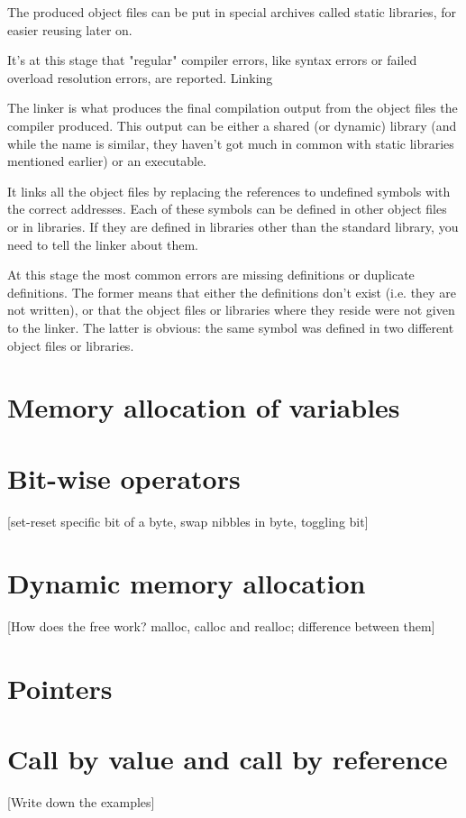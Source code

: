 \documentclass[11pt]{article}
\begin{document}
The produced object files can be put in special archives called static
libraries, for easier reusing later on.

It's at this stage that "regular" compiler errors, like syntax errors
or failed overload resolution errors, are reported.  Linking

The linker is what produces the final compilation output from the
object files the compiler produced. This output can be either a shared
(or dynamic) library (and while the name is similar, they haven't got
much in common with static libraries mentioned earlier) or an
executable.

It links all the object files by replacing the references to undefined
symbols with the correct addresses. Each of these symbols can be
defined in other object files or in libraries. If they are defined in
libraries other than the standard library, you need to tell the linker
about them.

At this stage the most common errors are missing definitions or
duplicate definitions. The former means that either the definitions
don't exist (i.e. they are not written), or that the object files or
libraries where they reside were not given to the linker. The latter
is obvious: the same symbol was defined in two different object files
or libraries.


\section{Memory allocation of variables}
\label{sec:org877f187}

\section{Bit-wise operators}
\label{sec:org7722d0e}
[set-reset specific bit of a byte, swap nibbles in byte, toggling bit]

\section{Dynamic memory allocation}
\label{sec:orgab863cc}
[How does the free work? malloc, calloc and realloc; difference
between them]

\section{Pointers}
\label{sec:org65ea7e9}

\section{Call by value and call by reference}
\label{sec:orgb35f7f3}
[Write down the examples]
\end{document}
